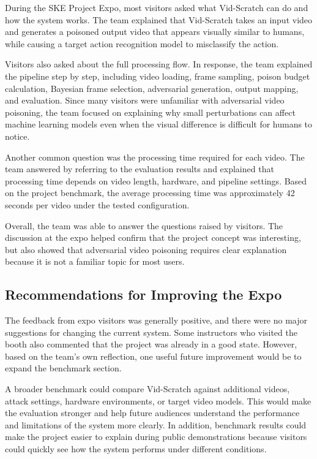 During the SKE Project Expo, most visitors asked what Vid-Scratch can
do and how the system works. The team explained that Vid-Scratch takes
an input video and generates a poisoned output video that appears
visually similar to humans, while causing a target action recognition
model to misclassify the action.

Visitors also asked about the full processing flow. In response, the
team explained the pipeline step by step, including video loading,
frame sampling, poison budget calculation, Bayesian frame selection,
adversarial generation, output mapping, and evaluation. Since many
visitors were unfamiliar with adversarial video poisoning, the team
focused on explaining why small perturbations can affect machine
learning models even when the visual difference is difficult for
humans to notice.

Another common question was the processing time required for each
video. The team answered by referring to the evaluation results and
explained that processing time depends on video length, hardware, and
pipeline settings. Based on the project benchmark, the average
processing time was approximately 42 seconds per video under the
tested configuration.

Overall, the team was able to answer the questions raised by visitors.
The discussion at the expo helped confirm that the project concept was
interesting, but also showed that adversarial video poisoning requires
clear explanation because it is not a familiar topic for most users.

\subsection{Recommendations for Improving the Expo}
\label{subsection:expo-recommendations}

The feedback from expo visitors was generally positive, and there were
no major suggestions for changing the current system. Some instructors
who visited the booth also commented that the project was already in a
good state. However, based on the team's own reflection, one useful
future improvement would be to expand the benchmark section.

A broader benchmark could compare Vid-Scratch against additional
videos, attack settings, hardware environments, or target video models.
This would make the evaluation stronger and help future audiences
understand the performance and limitations of the system more clearly.
In addition, benchmark results could make the project easier to explain
during public demonstrations because visitors could quickly see how
the system performs under different conditions.

